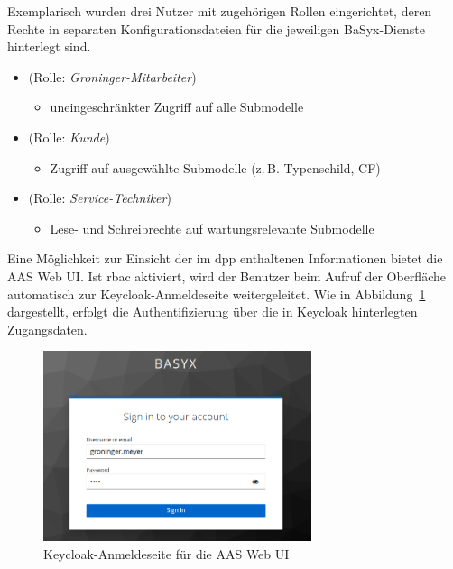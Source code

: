 Exemplarisch wurden drei Nutzer mit zugehörigen Rollen eingerichtet, deren Rechte in separaten Konfigurationsdateien für die jeweiligen BaSyx-Dienste hinterlegt sind.

\newpage
\begin{itemize}[noitemsep, leftmargin=*, label=\textbullet]
  \item {} (Rolle: \textit{Groninger-Mitarbeiter})
    \begin{itemize}[noitemsep, leftmargin=2em, label=--]
      \item uneingeschränkter Zugriff auf alle Submodelle
    \end{itemize}
  \item {} (Rolle: \textit{Kunde})
    \begin{itemize}[noitemsep, leftmargin=2em, label=--]
      \item Zugriff auf ausgewählte Submodelle (z.\,B. Typenschild, CF)
    \end{itemize}
  \item {} (Rolle: \textit{Service-Techniker})
    \begin{itemize}[noitemsep, leftmargin=2em, label=--]
      \item Lese- und Schreibrechte auf wartungsrelevante Submodelle
    \end{itemize}
\end{itemize}
\vspace{0.5em}

Eine Möglichkeit zur Einsicht der im \acs{dpp} enthaltenen Informationen bietet die AAS Web UI.
Ist \acs{rbac} aktiviert, wird der Benutzer beim Aufruf der Oberfläche automatisch zur Keycloak-Anmeldeseite weitergeleitet.
Wie in Abbildung~\ref{fig:KeycloakAnmeldeSeite} dargestellt, erfolgt die Authentifizierung über die in Keycloak hinterlegten Zugangsdaten.

\begin{figure}[htbp]
    \centering
        \includegraphics[width=0.7\textwidth]{Bilder/Ergebnisse/DPP/KeycloakAnmeldeSeite.png}
    \caption{Keycloak-Anmeldeseite für die AAS Web UI}
    \label{fig:KeycloakAnmeldeSeite}
\end{figure}

